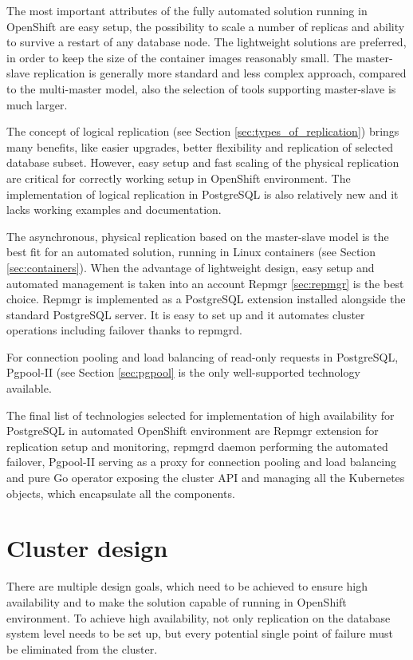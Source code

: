 \documentclass[
  digital, %
  twoside, %
  table,   %
  nolof,   %
  nolot,   %
]{fithesis3}
\begin{document}
The most important attributes of the fully automated solution running in OpenShift are easy setup, the possibility to scale a number of replicas and ability to survive a restart of any database node. The lightweight solutions are preferred, in order to keep the size of the container images reasonably small. The master-slave replication is generally more standard and less complex approach, compared to the multi-master model, also the selection of tools supporting master-slave is much larger.

The concept of logical replication (see Section \ref{sec:types_of_replication}) brings many benefits, like easier upgrades, better flexibility and replication of selected database subset. However, easy setup and fast scaling of the physical replication are critical for correctly working setup in OpenShift environment. The implementation of logical replication in PostgreSQL is also relatively new and it lacks working examples and documentation.

The asynchronous, physical replication based on the master-slave model is the best fit for an automated solution, running in Linux containers (see Section \ref{sec:containers}). When the advantage of lightweight design, easy setup and automated management is taken into an account Repmgr \ref{sec:repmgr} is the best choice. Repmgr is implemented as a PostgreSQL extension installed alongside the standard PostgreSQL server. It is easy to set up and it automates cluster operations including failover thanks to repmgrd.

For connection pooling and load balancing of read-only requests in PostgreSQL, Pgpool-II (see Section \ref{sec:pgpool} is the only well-supported technology available.

The final list of technologies selected for implementation of high availability for PostgreSQL in automated OpenShift environment are Repmgr extension for replication setup and monitoring, repmgrd daemon performing the automated failover, Pgpool-II serving as a proxy for connection pooling and load balancing and pure Go operator exposing the cluster API and managing all the Kubernetes objects, which encapsulate all the components.

\section{Cluster design}
There are multiple design goals, which need to be achieved to ensure high availability and to make the solution capable of running in OpenShift environment. To achieve high availability, not only replication on the database system level needs to be set up, but every potential single point of failure must be eliminated from the cluster.
\end{document}
